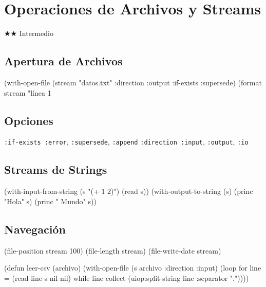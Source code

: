 \chapter{Operaciones de Archivos y Streams}
\label{chap:files-streams}
{\huge$\bigstar$}{\huge$\bigstar$} Intermedio

\section{Apertura de Archivos}
\begin{lispcode}
(with-open-file (stream "datos.txt" :direction :output :if-exists :supersede)
  (format stream "línea 1~%
\end{lispcode}

\section{Opciones}
\texttt{:if-exists :error}, \texttt{:supersede}, \texttt{:append}
\texttt{:direction :input}, \texttt{:output}, \texttt{:io}

\section{Streams de Strings}
\begin{lispcode}
(with-input-from-string (s "(+ 1 2)") (read s))
(with-output-to-string (s) (princ "Hola" s) (princ " Mundo" s))
\end{lispcode}

\section{Navegación}
\begin{lispcode}
(file-position stream 100)
(file-length stream)
(file-write-date stream)
\end{lispcode}

\begin{examplebox}[title=Procesamiento de CSV simple]
\begin{lispcode}
(defun leer-csv (archivo)
  (with-open-file (s archivo :direction :input)
    (loop for line = (read-line s nil nil) while line collect
          (uiop:split-string line :separator ","))))
\end{lispcode}
\end{examplebox}

